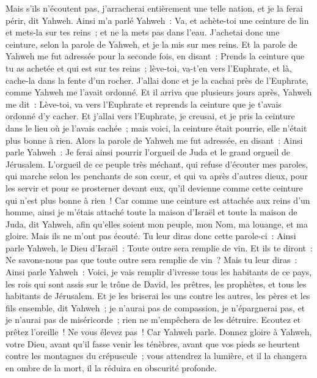 \begin{multicols}{2}
Mais s'ils n'écoutent pas, j'arracherai entièrement une telle nation, et je la ferai périr, dit Yahweh.
\VerseOne{}Ainsi m'a parlé Yahweh~: Va, et achète-toi une ceinture de lin et mets-la sur tes reins~; et ne la mets pas dans l'eau.
J'achetai donc une ceinture, selon la parole de Yahweh, et je la mis sur mes reins.
Et la parole de Yahweh me fut adressée pour la seconde fois, en disant~:
Prends la ceinture que tu as achetée et qui est sur tes reins~; lève-toi, va-t'en vers l'Euphrate, et là, cache-la dans la fente d'un rocher.
J'allai donc et je la cachai près de l'Euphrate, comme Yahweh me l'avait ordonné.
Et il arriva que plusieurs jours après, Yahweh me dit~: Lève-toi, va vers l'Euphrate et reprends la ceinture que je t'avais ordonné d'y cacher.
Et j'allai vers l'Euphrate, je creusai, et je pris la ceinture dans le lieu où je l'avais cachée~; mais voici, la ceinture était pourrie, elle n'était plus bonne à rien.
Alors la parole de Yahweh me fut adressée, en disant~:
Ainsi parle Yahweh~: Je ferai ainsi pourrir l'orgueil de Juda et le grand orgueil de Jérusalem.
L'orgueil de ce peuple très méchant, qui refuse d'écouter mes paroles, qui marche selon les penchants de son cœur, et qui va après d'autres dieux, pour les servir et pour se prosterner devant eux, qu'il devienne comme cette ceinture qui n'est plus bonne à rien~!
Car comme une ceinture est attachée aux reins d'un homme, ainsi je m'étais attaché toute la maison d'Israël et toute la maison de Juda, dit Yahweh, afin qu'elles soient mon peuple, mon Nom, ma louange, et ma gloire. Mais ils ne m'ont pas écouté.
Tu leur diras donc cette parole-ci~: Ainsi parle Yahweh, le Dieu d'Israël~: Toute outre sera remplie de vin. Et ils te diront~: Ne savons-nous pas que toute outre sera remplie de vin~?
Mais tu leur diras~: Ainsi parle Yahweh~: Voici, je vais remplir d'ivresse tous les habitants de ce pays, les rois qui sont assis sur le trône de David, les prêtres, les prophètes, et tous les habitants de Jérusalem.
Et je les briserai les uns contre les autres, les pères et les fils ensemble, dit Yahweh~; je n'aurai pas de compassion, je n'épargnerai pas, et je n'aurai pas de miséricorde~; rien ne m'empêchera de les détruire.
Ecoutez et prêtez l'oreille~! Ne vous élevez pas~! Car Yahweh parle.
Donnez gloire à Yahweh, votre Dieu, avant qu'il fasse venir les ténèbres, avant que vos pieds se heurtent contre les montagnes du crépuscule~; vous attendrez la lumière, et il la changera en ombre de la mort, il la réduira en obscurité profonde.

\end{multicols}
